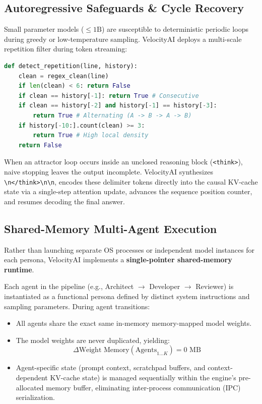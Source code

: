 \documentclass[10pt,twocolumn]{article}
\begin{document}
\subsection{Autoregressive Safeguards \& Cycle Recovery}
Small parameter models ($\le 1\text{B}$) are susceptible to deterministic periodic loops during greedy or low-temperature sampling. VelocityAI deploys a multi-scale repetition filter during token streaming:

\noindent\begin{minipage}{\columnwidth}
\begin{lstlisting}[language=Python]
def detect_repetition(line, history):
    clean = regex_clean(line)
    if len(clean) < 6: return False
    if clean == history[-1]: return True # Consecutive
    if clean == history[-2] and history[-1] == history[-3]:
        return True # Alternating (A -> B -> A -> B)
    if history[-10:].count(clean) >= 3:
        return True # High local density
    return False
\end{lstlisting}
\end{minipage}

When an attractor loop occurs inside an unclosed reasoning block (\texttt{<think>}), naive stopping leaves the output incomplete. VelocityAI synthesizes \texttt{\textbackslash n</think>\textbackslash n\textbackslash n}, encodes these delimiter tokens directly into the causal KV-cache state via a single-step attention update, advances the sequence position counter, and resumes decoding the final answer.

\subsection{Shared-Memory Multi-Agent Execution}
Rather than launching separate OS processes or independent model instances for each persona, VelocityAI implements a \textbf{single-pointer shared-memory runtime}.

Each agent in the pipeline (e.g., Architect $\to$ Developer $\to$ Reviewer) is instantiated as a functional persona defined by distinct system instructions and sampling parameters. During agent transitions:
\begin{itemize}
    \item All agents share the exact same in-memory memory-mapped model weights.
    \item The model weights are never duplicated, yielding:
    \begin{equation}
    \Delta \text{Weight Memory}(\text{Agents}_{1 \dots K}) = 0 \text{ MB}
    \end{equation}
    \item Agent-specific state (prompt context, scratchpad buffers, and context-dependent KV-cache state) is managed sequentially within the engine's pre-allocated memory buffer, eliminating inter-process communication (IPC) serialization.
\end{itemize}
\end{document}
